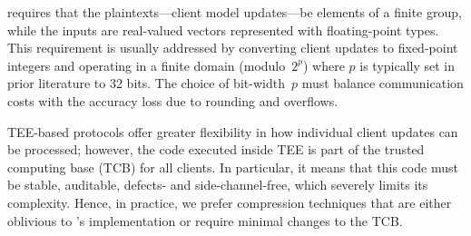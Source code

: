 \SecAgg requires that the plaintexts---client model updates---be elements of a finite group, while the inputs are real-valued vectors represented with floating-point types.
This requirement is usually addressed by converting client updates to fixed-point integers and operating in a finite domain (modulo~$2^p$) where $p$ is typically set in prior literature to 32 bits. The choice of \SecAgg bit-width~$p$ must balance communication costs with the accuracy loss due to rounding and overflows.

TEE-based protocols offer greater flexibility in how individual client updates can be processed; however, the code executed inside TEE is part of the trusted computing base (TCB) for all clients. In particular, it means that this code must be stable, auditable, defects- and side-channel-free, which severely limits its complexity. Hence, in practice, we prefer compression techniques that are either oblivious to \SecAgg's implementation or require minimal changes to the TCB.



